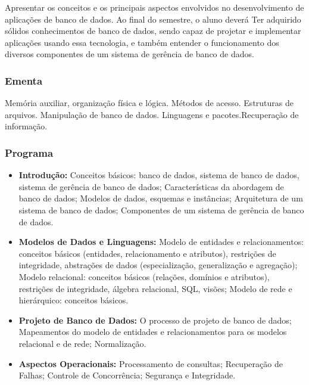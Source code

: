 \documentclass[12pt, a4paper]{article}
\begin{document}
Apresentar os conceitos e os principais aspectos envolvidos no desenvolvimento de aplicações de banco de dados. Ao final do semestre, o aluno deverá Ter adquirido sólidos conhecimentos de banco de dados, sendo capaz de projetar e implementar aplicações usando essa tecnologia, e também entender o funcionamento dos diversos componentes de um sistema de gerência de banco de dados.

\subsubsection{Ementa} \label{subsubsec:ementa}


Memória auxiliar, organização física e lógica. Métodos de acesso. Estruturas de arquivos. Manipulação de banco de dados. Linguagens e pacotes.Recuperação de informação.

\subsubsection{Programa} \label{subsubsec:programa}


\begin{itemize}
  \item \textbf{Introdução:}
        Conceitos básicos: banco de dados, sistema de banco de dados, sistema de gerência de banco de dados; Características da abordagem de banco de dados; Modelos de dados, esquemas e instâncias; Arquitetura de um sistema de banco de dados; Componentes de um sistema de gerência de banco de dados.
\item \textbf{Modelos de Dados e Linguagens:}
        Modelo de entidades e relacionamentos: conceitos básicos (entidades, relacionamento e atributos), restrições de integridade, abstrações de dados (especialização, generalização e agregação); Modelo relacional: conceitos básicos (relações, domínios e atributos), restrições de integridade, álgebra relacional, SQL, visões; Modelo de rede e hierárquico: conceitos básicos.
\item \textbf{Projeto de Banco de Dados:}
        O processo de projeto de banco de dados; Mapeamentos do modelo de entidades e relacionamentos para os modelos relacional e de rede; Normalização.
\item \textbf{Aspectos Operacionais:}
        Processamento de consultas; Recuperação de Falhas; Controle de Concorrência; Segurança e Integridade.
\end{itemize}
\end{document}
